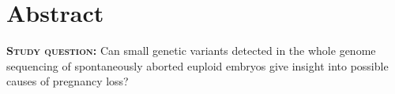 \section*{Abstract}





\textbf{\textsc{Study question:}} 
Can small genetic variants detected in the whole genome sequencing of spontaneously aborted euploid embryos give insight into possible causes of pregnancy loss?


